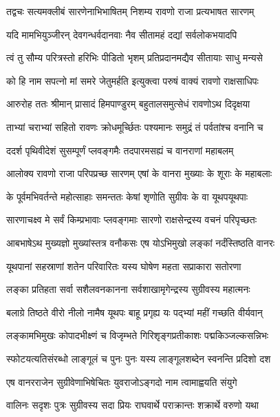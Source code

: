 
\twolineshloka
{तद्वचः सत्यमक्लीबं सारणेनाभिभाषितम्}
{निशम्य रावणो राजा प्रत्यभाषत सारणम्} %

\twolineshloka
{यदि मामभियुञ्जीरन् देवगन्धर्वदानवाः}
{नैव सीतामहं दद्यां सर्वलोकभयादपि} %

\twolineshloka
{त्वं तु सौम्य परित्रस्तो हरिभिः पीडितो भृशम्}
{प्रतिप्रदानमद्यैव सीतायाः साधु मन्यसे} %

\twolineshloka
{को हि नाम सपत्नो मां समरे जेतुमर्हति}
{इत्युक्त्वा परुषं वाक्यं रावणो राक्षसाधिपः} %

\twolineshloka
{आरुरोह ततः श्रीमान् प्रासादं हिमपाण्डुरम्}
{बहुतालसमुत्सेधं रावणोऽथ दिदृक्षया} %

\twolineshloka
{ताभ्यां चराभ्यां सहितो रावणः क्रोधमूर्च्छितः}
{पश्यमानः समुद्रं तं पर्वतांश्च वनानि च} %

\twolineshloka
{ददर्श पृथिवीदेशं सुसम्पूर्णं प्लवङ्गमैः}
{तदपारमसह्यं च वानराणां महाबलम्} %

\twolineshloka
{आलोक्य रावणो राजा परिपप्रच्छ सारणम्}
{एषां के वानरा मुख्याः के शूराः के महाबलाः} %

\twolineshloka
{के पूर्वमभिवर्तन्ते महोत्साहाः समन्ततः}
{केषां शृणोति सुग्रीवः के वा यूथपयूथपाः} %

\twolineshloka
{सारणाचक्ष्व मे सर्वं किम्प्रभावाः प्लवङ्गमाः}
{सारणो राक्षसेन्द्रस्य वचनं परिपृच्छतः} %

\twolineshloka
{आबभाषेऽथ मुख्यज्ञो मुख्यांस्तत्र वनौकसः}
{एष योऽभिमुखो लङ्कां नर्दंस्तिष्ठति वानरः} %

\twolineshloka
{यूथपानां सहस्राणां शतेन परिवारितः}
{यस्य घोषेण महता सप्राकारा सतोरणा} %

\twolineshloka
{लङ्का प्रतिहता सर्वा सशैलवनकानना}
{सर्वशाखामृगेन्द्रस्य सुग्रीवस्य महात्मनः} %

\twolineshloka
{बलाग्रे तिष्ठते वीरो नीलो नामैष यूथपः}
{बाहू प्रगृह्य यः पद्भ्यां महीं गच्छति वीर्यवान्} %

\twolineshloka
{लङ्कामभिमुखः कोपादभीक्ष्णं च विजृम्भते}
{गिरिशृङ्गप्रतीकाशः पद्मकिञ्जल्कसन्निभः} %

\twolineshloka
{स्फोटयत्यतिसंरब्धो लाङ्गूलं च पुनः पुनः}
{यस्य लाङ्गूलशब्देन स्वनन्ति प्रदिशो दश} %

\twolineshloka
{एष वानरराजेन सुग्रीवेणाभिषेचितः}
{युवराजोऽङ्गदो नाम त्वामाह्वयति संयुगे} %

\twolineshloka
{वालिनः सदृशः पुत्रः सुग्रीवस्य सदा प्रियः}
{राघवार्थे पराक्रान्तः शक्रार्थे वरुणो यथा} %

